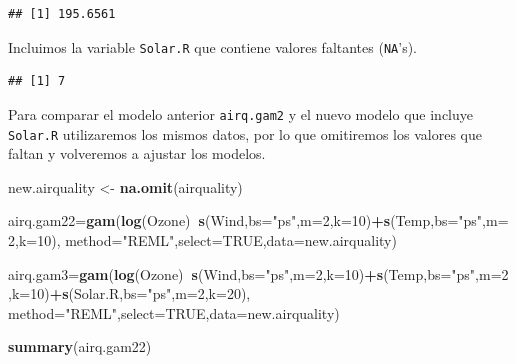 \documentclass[]{book}
\newenvironment{Shaded}{\begin{snugshade}}{\end{snugshade}}
\newcommand{\KeywordTok}[1]{\textcolor[rgb]{0.13,0.29,0.53}{\textbf{#1}}}
\newcommand{\DataTypeTok}[1]{\textcolor[rgb]{0.13,0.29,0.53}{#1}}
\newcommand{\DecValTok}[1]{\textcolor[rgb]{0.00,0.00,0.81}{#1}}
\newcommand{\StringTok}[1]{\textcolor[rgb]{0.31,0.60,0.02}{#1}}
\newcommand{\OtherTok}[1]{\textcolor[rgb]{0.56,0.35,0.01}{#1}}
\newcommand{\OperatorTok}[1]{\textcolor[rgb]{0.81,0.36,0.00}{\textbf{#1}}}
\newcommand{\NormalTok}[1]{#1}
\begin{document}
\begin{verbatim}
## [1] 195.6561
\end{verbatim}

Incluimos la variable \texttt{Solar.R} que contiene valores faltantes
(\texttt{NA}'s).

\begin{Shaded}
\end{Shaded}

\begin{verbatim}
## [1] 7
\end{verbatim}

Para comparar el modelo anterior \texttt{airq.gam2} y el nuevo modelo
que incluye \texttt{Solar.R} utilizaremos los mismos datos, por lo que
omitiremos los valores que faltan y volveremos a ajustar los modelos.

\begin{Shaded}
\begin{Highlighting}[]
\NormalTok{new.airquality <-}\StringTok{ }\KeywordTok{na.omit}\NormalTok{(airquality)}

\NormalTok{airq.gam22=}\KeywordTok{gam}\NormalTok{(}\KeywordTok{log}\NormalTok{(Ozone)}\OperatorTok{~}\KeywordTok{s}\NormalTok{(Wind,}\DataTypeTok{bs=}\StringTok{"ps"}\NormalTok{,}\DataTypeTok{m=}\DecValTok{2}\NormalTok{,}\DataTypeTok{k=}\DecValTok{10}\NormalTok{)}\OperatorTok{+}\KeywordTok{s}\NormalTok{(Temp,}\DataTypeTok{bs=}\StringTok{"ps"}\NormalTok{,}\DataTypeTok{m=}\DecValTok{2}\NormalTok{,}\DataTypeTok{k=}\DecValTok{10}\NormalTok{),}
               \DataTypeTok{method=}\StringTok{"REML"}\NormalTok{,}\DataTypeTok{select=}\OtherTok{TRUE}\NormalTok{,}\DataTypeTok{data=}\NormalTok{new.airquality)}

\NormalTok{airq.gam3=}\KeywordTok{gam}\NormalTok{(}\KeywordTok{log}\NormalTok{(Ozone)}\OperatorTok{~}\KeywordTok{s}\NormalTok{(Wind,}\DataTypeTok{bs=}\StringTok{"ps"}\NormalTok{,}\DataTypeTok{m=}\DecValTok{2}\NormalTok{,}\DataTypeTok{k=}\DecValTok{10}\NormalTok{)}\OperatorTok{+}\KeywordTok{s}\NormalTok{(Temp,}\DataTypeTok{bs=}\StringTok{"ps"}\NormalTok{,}\DataTypeTok{m=}\DecValTok{2}\NormalTok{,}\DataTypeTok{k=}\DecValTok{10}\NormalTok{)}\OperatorTok{+}\KeywordTok{s}\NormalTok{(Solar.R,}\DataTypeTok{bs=}\StringTok{"ps"}\NormalTok{,}\DataTypeTok{m=}\DecValTok{2}\NormalTok{,}\DataTypeTok{k=}\DecValTok{20}\NormalTok{),}
              \DataTypeTok{method=}\StringTok{"REML"}\NormalTok{,}\DataTypeTok{select=}\OtherTok{TRUE}\NormalTok{,}\DataTypeTok{data=}\NormalTok{new.airquality)}

\KeywordTok{summary}\NormalTok{(airq.gam22)}
\end{Highlighting}
\end{Shaded}
\end{document}
